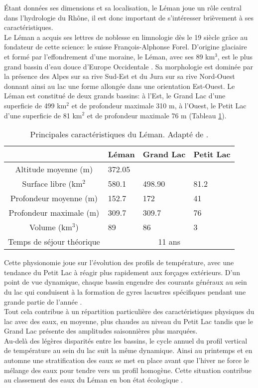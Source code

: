 \'Etant données ses dimensions et sa localisation, le Léman joue un rôle central dans l'hydrologie du Rhône, il est donc important de s'intéresser brièvement à ses caractéristiques.\\

Le Léman a acquis ses lettres de noblesse en limnologie dès le 19\ieme{} siècle grâce au fondateur de cette science: le suisse François-Alphonse Forel. D'origine glaciaire et formé par l'effondrement d'une moraine, le Léman, avec ses 89 km$^{3}$, est le plus grand bassin d'eau douce d'Europe Occidentale \citep{cipel2019}. Sa morphologie est dominée par la présence des Alpes sur sa rive Sud-Est et du Jura sur sa rive Nord-Ouest donnant ainsi au lac une forme allongée dans une orientation Est-Ouest. Le Léman est constitué de deux grands bassins: à l'Est, le Grand Lac d'une superficie de 499 km$^{2}$ et de profondeur maximale 310 m, à l'Ouest, le Petit Lac d'une superficie de 81 km$^{2}$ et de profondeur maximale 76 m (Tableau \ref{tab_leman}).\\ 

\begin{table}[h!]
 \caption{Principales caractéristiques du Léman. Adapté de \citet{cipel2019}.}
 \label{tab_leman}
 \begin{tabularx}{\textwidth}{cXXX}
 \hline
 & Léman & Grand Lac & Petit Lac \\
 \hline
  Altitude moyenne (m)& 372.05 &&\\
  Surface libre (km$^{2}$&580.1&498.90&81.2\\
  Profondeur moyenne (m)&152.7&172&41\\
  Profondeur maximale (m)&309.7&309.7&76\\ 
  Volume (km$^{3}$) &89&86&3\\
  Temps de séjour théorique &\multicolumn{3}{c}{11 ans}\\
  \hline
 \end{tabularx}
\end{table}

Cette physionomie joue sur l'évolution des profils de température, avec une tendance du Petit Lac à réagir plus rapidement aux forçages extérieurs. D'un point de vue dynamique, chaque bassin engendre des courants généraux au sein du lac qui conduisent à la formation de gyres lacustres spécifiques pendant une grande partie de l'année \citep{lethi2012}. \\
Tout cela contribue à un répartition particulière des caractéristiques physiques du lac avec des eaux, en moyenne, plus chaudes au niveau du Petit Lac tandis que le Grand Lac présente des amplitudes saisonnières plus marquées.\\
Au-delà des légères disparités entre les bassins, le cycle annuel du profil vertical de température au sein du lac suit la même dynamique. Ainsi au printemps et en automne une stratification des eaux se met en place avant que l'hiver ne force le mélange des eaux pour tendre vers un profil homogène. Cette situation contribue au classement des eaux du Léman en bon état écologique \citep[Figure \ref{soulignacfig},][]{soulignac2019}. \\

